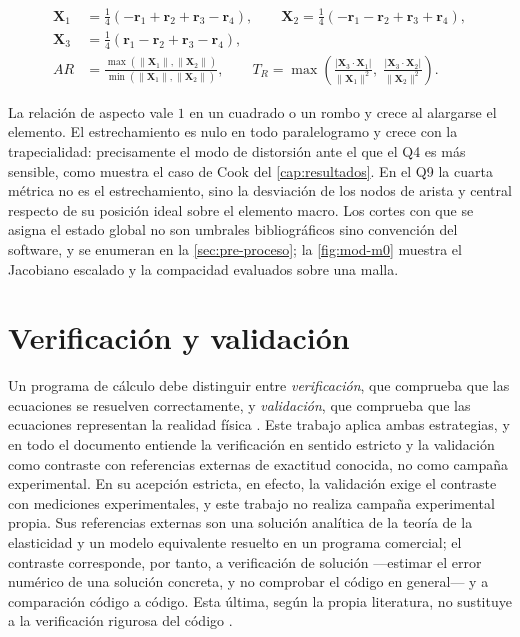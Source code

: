 \begin{equation}
\begin{aligned}
\bm{X}_1 &= \tfrac{1}{4}\left(-\bm{r}_1 + \bm{r}_2 + \bm{r}_3 - \bm{r}_4\right), \qquad
\bm{X}_2 = \tfrac{1}{4}\left(-\bm{r}_1 - \bm{r}_2 + \bm{r}_3 + \bm{r}_4\right), \\[2pt]
\bm{X}_3 &= \tfrac{1}{4}\left(\bm{r}_1 - \bm{r}_2 + \bm{r}_3 - \bm{r}_4\right), \\[4pt]
AR &= \frac{\max(\|\bm{X}_1\|, \|\bm{X}_2\|)}{\min(\|\bm{X}_1\|, \|\bm{X}_2\|)}, \qquad
T_R = \max\left(\frac{|\bm{X}_3 \cdot \bm{X}_1|}{\|\bm{X}_1\|^2},\; \frac{|\bm{X}_3 \cdot \bm{X}_2|}{\|\bm{X}_2\|^2}\right).
\end{aligned}
\label{eq:descomposicion-bilineal}
\end{equation}

La relación de aspecto vale $1$ en un cuadrado o un rombo y crece al alargarse el elemento. El estrechamiento es nulo en todo paralelogramo y crece con la trapecialidad: precisamente el modo de distorsión ante el que el Q4 es más sensible, como muestra el caso de Cook del \autoref{cap:resultados}. En el Q9 la cuarta métrica no es el estrechamiento, sino la desviación de los nodos de arista y central respecto de su posición ideal sobre el elemento macro. Los cortes con que se asigna el estado global no son umbrales bibliográficos sino convención del software, y se enumeran en la \autoref{sec:pre-proceso}; la \autoref{fig:mod-m0} muestra el Jacobiano escalado y la compacidad evaluados sobre una malla.

\section{Verificación y validación}
\label{sec:verificacion-validacion}

Un programa de cálculo debe distinguir entre \emph{verificación}, que comprueba que las ecuaciones se resuelven correctamente, y \emph{validación}, que comprueba que las ecuaciones representan la realidad física \autocite[pp.~13-14]{oberkampf2010vv}. Este trabajo aplica ambas estrategias, y en todo el documento entiende la verificación en sentido estricto y la validación como contraste con referencias externas de exactitud conocida, no como campaña experimental. En su acepción estricta, en efecto, la validación exige el contraste con mediciones experimentales, y este trabajo no realiza campaña experimental propia. Sus referencias externas son una solución analítica de la teoría de la elasticidad y un modelo equivalente resuelto en un programa comercial; el contraste corresponde, por tanto, a verificación de solución ---estimar el error numérico de una solución concreta, y no comprobar el código en general--- y a comparación código a código. Esta última, según la propia literatura, no sustituye a la verificación rigurosa del código \autocite[pp.~173-174]{oberkampf2010vv}.


